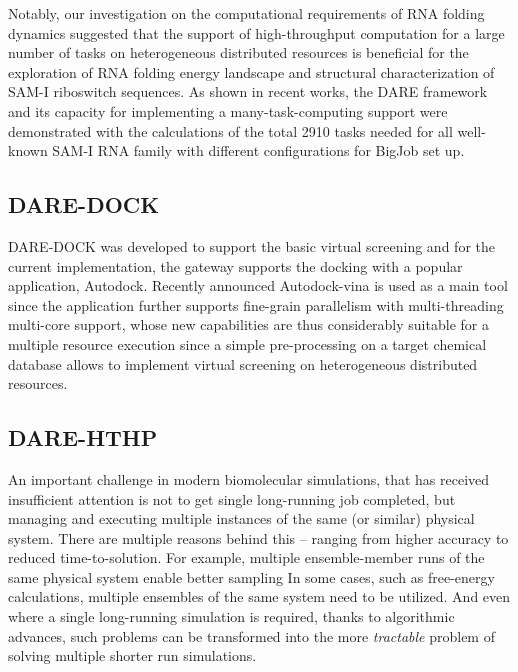 \documentclass{sig-alternate}
\begin{document}
Notably, our investigation on the computational requirements of RNA
folding dynamics suggested that the support of high-throughput
computation for a large number of tasks on heterogeneous distributed
resources is beneficial for the exploration of RNA folding energy
landscape and structural characterization of SAM-I riboswitch
sequences.  As shown in recent works\cite{ecmls10,ccpe11}, the DARE
framework and its capacity for implementing a many-task-computing
support were demonstrated with the calculations of the total 2910
tasks needed for all well-known SAM-I RNA family with different
configurations for BigJob set up\cite{ecmls10}.


\subsection{DARE-DOCK}
DARE-DOCK was developed to support the basic virtual screening and for
the current implementation, the gateway supports the docking with a
popular application, Autodock\cite{autodock}.  Recently announced
Autodock-vina is used as a main tool since the application further
supports fine-grain parallelism with multi-threading multi-core
support, whose new capabilities are thus considerably suitable for a
multiple resource execution since a simple pre-processing on a target
chemical database allows to implement virtual screening on
heterogeneous distributed resources.

%

\subsection{DARE-HTHP}

An important challenge in modern biomolecular simulations, that has
received insufficient attention is not to get single long-running job
completed, but managing and executing multiple instances of the same
(or similar) physical system.  There are multiple reasons behind this
-- ranging from higher accuracy to reduced time-to-solution. For
example, multiple ensemble-member runs of the same physical system
enable better sampling In some cases, such as free-energy
calculations, multiple ensembles of the same system need to be
utilized. And even where a single long-running simulation is required,
thanks to algorithmic advances, such problems can be transformed into
the more {\it tractable} problem of solving multiple shorter run
simulations.
\end{document}

